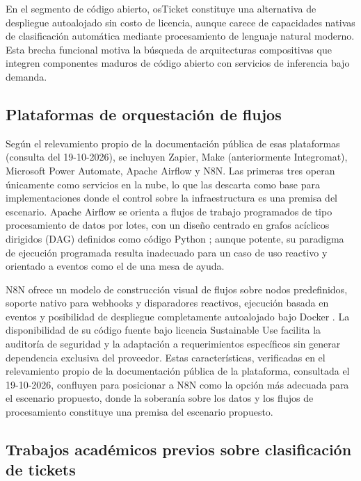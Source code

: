 En el segmento de código abierto, osTicket constituye una alternativa de despliegue autoalojado sin costo de licencia, aunque carece de capacidades nativas de clasificación automática mediante procesamiento de lenguaje natural moderno. Esta brecha funcional motiva la búsqueda de arquitecturas compositivas que integren componentes maduros de código abierto con servicios de inferencia bajo demanda.

\subsection{Plataformas de orquestación de flujos}\label{subsec:plataformas-orquestacion}

Según el relevamiento propio de la documentación pública de esas plataformas (consulta del 19-10-2026), se incluyen Zapier, Make (anteriormente Integromat), Microsoft Power Automate, Apache Airflow y N8N. Las primeras tres operan únicamente como servicios en la nube, lo que las descarta como base para implementaciones donde el control sobre la infraestructura es una premisa del escenario. Apache Airflow se orienta a flujos de trabajo programados de tipo procesamiento de datos por lotes, con un diseño centrado en grafos acíclicos dirigidos (DAG) definidos como código Python \parencite{Apache2024_airflow}; aunque potente, su paradigma de ejecución programada resulta inadecuado para un caso de uso reactivo y orientado a eventos como el de una mesa de ayuda.

N8N ofrece un modelo de construcción visual de flujos sobre nodos predefinidos, soporte nativo para webhooks y disparadores reactivos, ejecución basada en eventos y posibilidad de despliegue completamente autoalojado bajo Docker \parencite{n8n2024_docs}. La disponibilidad de su código fuente bajo licencia Sustainable Use facilita la auditoría de seguridad y la adaptación a requerimientos específicos sin generar dependencia exclusiva del proveedor. Estas características, verificadas en el relevamiento propio de la documentación pública de la plataforma, consultada el 19-10-2026, confluyen para posicionar a N8N como la opción más adecuada para el escenario propuesto, donde la soberanía sobre los datos y los flujos de procesamiento constituye una premisa del escenario propuesto.

\subsection{Trabajos académicos previos sobre clasificación de tickets}\label{subsec:trabajos-academicos}

